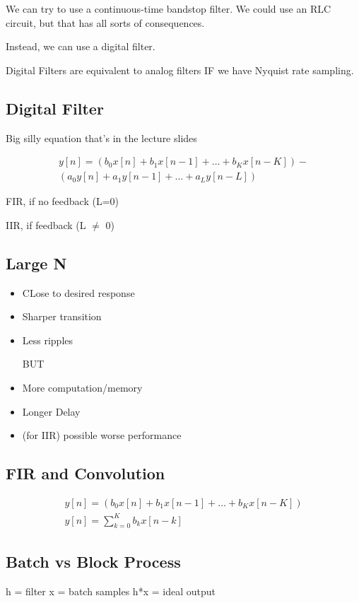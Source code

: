 \documentclass[fleqn]{report}
\newcommand{\hp}{\hspace{1cm}}
\newcommand{\equations} [1] {
\begin{gather*}
#1
\end{gather*}
}
\begin{document}
We can try to use a continuous-time bandstop filter.
We could use an RLC circuit, but that has all sorts of consequences.

Instead, we can use a digital filter.

Digital Filters are equivalent to analog filters IF we have 
Nyquist rate sampling.

\subsection{Digital Filter}
Big silly equation that's in the lecture slides

\equations{
    y[n]
    =
    (b_0 x[n] + b_1 x[n-1] + \ldots + b_K x[n-K])
    -
    \\
    (a_0 y[n] + a_1 y[n-1] + \ldots + a_L y[n-L])
}

FIR, if no feedback (L=0)

IIR, if feedback (L $\neq$ 0)

\subsection{Large N}
\begin{itemize}
    \item 
    CLose to desired response 
    \item 
    Sharper transition 
    \item 
    Less ripples 

    BUT 
    \item 
    More computation/memory 
    \item 
    Longer Delay 
    \item 
    (for IIR) possible worse performance

\end{itemize}

\subsection{FIR and Convolution}
\equations{
    y[n]
    =
    (b_0 x[n] + b_1 x[n-1] + \ldots + b_K x[n-K])
    \\
    y[n]
    =
    \sum^K_{k = 0}
    b_k x[n-k]
}

\subsection{Batch vs Block Process}
h = filter 
\hp 
x = batch samples 
\hp 
h*x = ideal output
\end{document}
